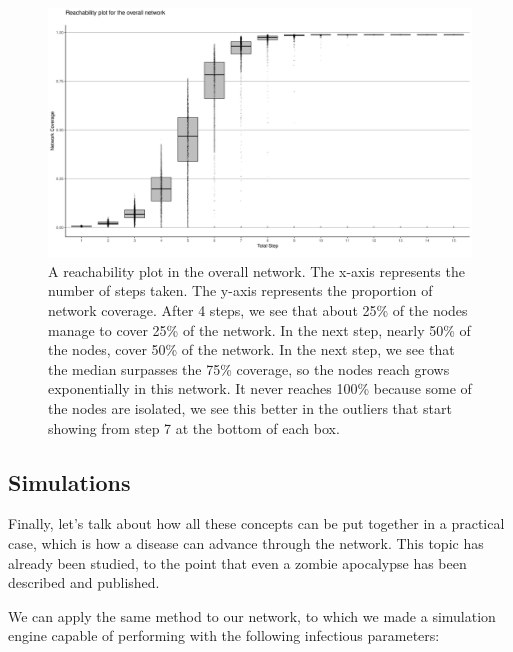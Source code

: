     \begin{figure}[h!]
        \centering
            \includegraphics[width=0.7\linewidth]{figures/Networks/Reach/CategoricalBoxplot_reachplot_variable_value.png} 
        \caption{A reachability plot in the overall network. The x-axis represents the number of steps taken. The y-axis represents the proportion of network coverage. After 4 steps, we see that about 25\% of the nodes manage to cover 25\% of the network. In the next step, nearly 50\% of the nodes, cover 50\% of the network. In the next step, we see that the median surpasses the 75\% coverage, so the nodes reach grows exponentially in this network. It never reaches 100\% because some of the nodes are isolated, we see this better in the outliers that start showing from step 7 at the bottom of each box.}
        \label{figure:networksReach}
    \end{figure}    

\subsection{Simulations}

Finally, let's talk about how all these concepts can be put together in a practical case, which is how a disease can advance through the network. This topic has already been studied, to the point that even a zombie apocalypse has been described and published. \cite{Munz2009WHENZA}


We can apply the same method to our network, to which we made a simulation engine capable of performing with the following infectious parameters:

